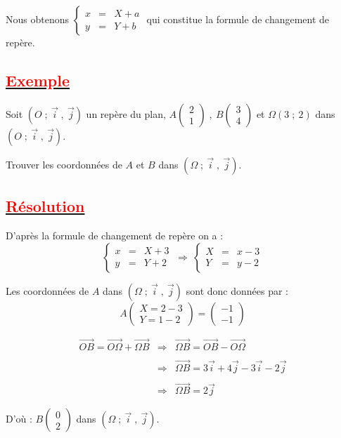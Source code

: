 \documentclass[12pt]{article}
\begin{document}
		Nous obtenons $\left\lbrace\begin{array}{lcl}
		x &=&X+a\\
		y &=&Y+b
		\end{array}
		\right.$ qui constitue la formule de changement de repère.
\subsection*{\underline{\textcolor{red}{\textbf{Exemple}}}}
Soit $(O\;;\ \vec{i}\;,\ \vec{j})$ un repère du plan, $A\begin{pmatrix} 2 \\ 1\end{pmatrix}\;,\ B\begin{pmatrix} 3 \\ 4\end{pmatrix}$ et $\Omega(3\;;\ 2)$ dans $(O\;;\ \vec{i}\;,\ \vec{j}).$

Trouver les coordonnées de $A$ et $B$ dans $(\Omega\;;\ \vec{i}\;,\ \vec{j}).$
\subsection*{\underline{\textcolor{red}{\textbf{Résolution}}}}
D'après la formule de changement de repère on a : $$\left\lbrace\begin{array}{rcl} x&=&X+3 \\ y&=&Y+2\end{array}\right.\ \Rightarrow\ \left\lbrace\begin{array}{rcl} X&=&x-3 \\ Y&=&y-2\end{array}\right.$$

Les coordonnées de $A$ dans $(\Omega\;;\ \vec{i}\;,\ \vec{j})$ sont donc données par : $$A\begin{pmatrix} X=2-3 \\ Y=1-2\end{pmatrix}=\begin{pmatrix} -1 \\ -1\end{pmatrix}$$

$$\begin{array}{rcl}\overrightarrow{OB}=\overrightarrow{O\Omega}+\overrightarrow{\Omega B}&\Rightarrow&\overrightarrow{\Omega B}=\overrightarrow{OB}-\overrightarrow{O\Omega}\\ \\ &\Rightarrow&\overrightarrow{\Omega B}=3\vec{i}+4\vec{j}-3\vec{i}-2\vec{j}\\ \\ &\Rightarrow&\overrightarrow{\Omega B}=2\vec{j}\end{array}$$

D'où : $B\begin{pmatrix} 0 \\ 2\end{pmatrix}$ dans $(\Omega\;;\ \vec{i}\;,\ \vec{j}).$ 
\end{document}
